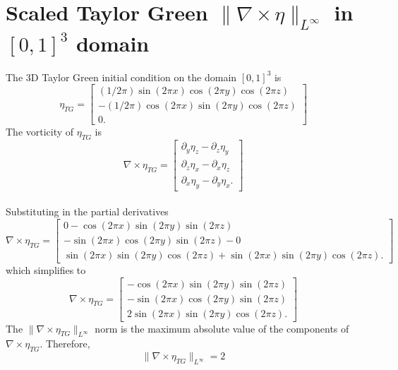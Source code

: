 \chapter{Scaled Taylor Green $\|\nabla\times\eta\|_{L^\infty}$ in $[0,1]^3$ domain}
\label{app:tg:vorticity:1:scaled}

The 3D Taylor Green initial condition on the domain $[0,1]^3$ is
$$\eta_{TG} = \begin{bmatrix}
           (1/2\pi)\sin(2\pi x)\cos(2\pi y)\cos(2\pi z) \\
           -(1/2\pi)\cos(2\pi x)\sin(2\pi y)\cos(2\pi z) \\
           0.
         \end{bmatrix}$$
The vorticity of $\eta_{TG}$ is
$$\nabla \times \eta_{TG} = \begin{bmatrix}
           \partial_y\eta_z - \partial_z\eta_y \\
           \partial_z\eta_x - \partial_x\eta_z \\
           \partial_x\eta_y - \partial_y\eta_x.
         \end{bmatrix}$$
\\
Substituting in the partial derivatives
\\
$$\nabla \times \eta_{TG} = \begin{bmatrix}
           0 - \cos(2\pi x)\sin(2\pi y)\sin(2\pi z) \\
           -\sin(2\pi x)\cos(2\pi y)\sin(2\pi z) - 0\\
           \sin(2\pi x)\sin(2\pi y)\cos(2\pi z) + \sin(2\pi x)\sin(2\pi y)\cos(2\pi z).
         \end{bmatrix}$$
which simplifies to 
$$\nabla \times \eta_{TG} = \begin{bmatrix}
           -\cos(2\pi x)\sin(2\pi y)\sin(2\pi z) \\
           -\sin(2\pi x)\cos(2\pi y)\sin(2\pi z)\\
           2\sin(2\pi x)\sin(2\pi y)\cos(2\pi z).
         \end{bmatrix}$$
The $\|\nabla \times \eta_{TG}\|_{L^{\infty}}$ norm is the maximum absolute value of the components of $\nabla \times \eta_{TG}$. Therefore,
$$\|\nabla \times \eta_{TG}\|_{L^{\infty}} = 2$$